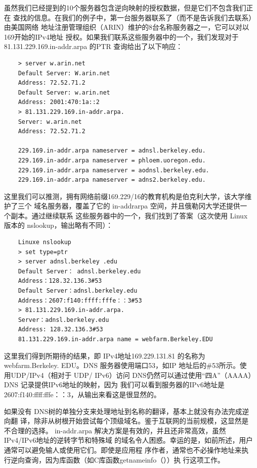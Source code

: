 虽然我们已经提到的10个服务器包含逆向映射的授权数据，但是它们不包含我们正在
查找的信息。在我们的例子中，第一台服务器联系了（而不是告诉我们去联系）由美国网络
地址注册管理组织（ARIN）维护的8台名称服务器之一，它可以对以 169开始的IPv4地址
授权。如果我们联系这些服务器中的一个，我们发现对于81.131.229.169.in-addr.arpa 的PTR
查询给出了以下响应：
\begin{verbatim} 
    > server w.arin.net
    Default Server: W.arin.net
    Address: 72.52.71.2
    Default Server: w.arin.net
    Address: 2001:470:1a::2
    > 81.131.229.169.in-addr.arpa.
    Server: w.arin.net
    Address: 72.52.71.2

    229.169.in-addr.arpa nameserver = adnsl.berkeley.edu.
    229.169.in-addr.arpa nameserver = phloem.uoregon.edu.
    229.169.in-addr.arpa nameserver = aodnsl.berkeley.edu.
    229.169.in-addr.arpa nameserver = adns2.berkeley.edu.
\end{verbatim}

这里我们可以推测，拥有网络前缀169.229/16的教育机构是伯克利大学，该大学维护了三个
域名服务器，覆盖了它的 in-addrarpa 空间，并且俄勒冈大学还提供一个副本。通过继续联系
这些服务器中的一个，我们找到了答案（这次使用 Linux版本的 nslookup，输出略有不同）：

\begin{verbatim}
    Linuxe nslookup
    > set type=ptr
    > server adnsl.berkeley .edu
    Default Server： adnsl.berkeley.edu
    Address：128.32.136.3#53
    Default Server：adnsl.berkeley.edu
    Address：2607:f140:ffff:fffe：：3#53
    > 81.131.229.169.in-addr.arpa.
    Server：adnsl.berkeley.edu
    Address: 128.32.136.3#53
    81.131.229.169.in-addr.arpa name = webfarm.Berkeley.EDU
\end{verbatim}

这里我们得到所期待的结果，即 IPv4地址169.229.131.81 的名称为 webfarm.Berkeley.
EDU。DNS 服务器使用端口53，如IP 地址后的\#53所示。使用UDP/IPv4（相对于 UDP/
IPv6）访问 DNS仍然可以通过使用“四A”（AAAA）DNS 记录提供IPv6地址的映射，因为
我们可以看到服务器的IPv6地址是 2607:f140:ffff:fffe：：3，从输出来看这是很显然的。

如果没有 DNS树的单独分支来处理地址到名称的翻译，基本上就没有办法完成逆向翻
译，除非从树根开始尝试每个顶级域名。鉴于互联网的当前规模，这显然是不合理的选择。
in-addr.arpa 解决方案是有效的，并且还非常高效，虽然IPv4/IPv6地址的逆转字节和特殊域
的域名令人困惑。幸运的是，如前所述，用户通常可以避免输人或使用它们。即使是应用程
序作者，通常也不必操作地址来执行逆向查询，因为库函数（如C库函数getnameinfo（））执
行这项工作。

